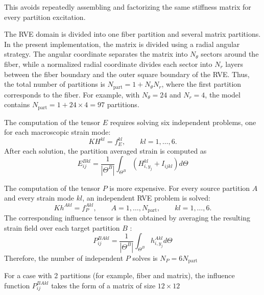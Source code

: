 \documentclass[12pt]{article}
\begin{document}
This avoids repeatedly assembling and factorizing the same stiffness matrix for every partition excitation.

The RVE domain is divided into one fiber partition and several matrix partitions. In the present implementation, the matrix is divided using a radial angular strategy. The angular coordinate separates the matrix into $N_\theta$ sectors around the fiber, while a normalized radial coordinate divides each sector into $N_r$ layers between the fiber boundary and the outer square boundary of the RVE. Thus, the total number of partitions is $N_{\mathrm{part}} = 1 + N_\theta N_r$, where the first partition corresponds to the fiber. For example, with $N_\theta=24$ and $N_r=4$, the model contains $N_{\mathrm{part}} = 1 + 24 \times 4 = 97$ partitions.

The computation of the tensor $E$ requires solving six independent problems, one for each macroscopic strain mode:
\begin{equation}
K H^{kl} = f_E^{kl},
\qquad kl = 1,\ldots,6.
\end{equation}
After each solution, the partition averaged strain is computed as
\begin{equation}
E^{Bkl}_{ij} = \frac{1}{|\Theta^B|}\int_{\Theta^B}\left(H^{kl}_{i,y_j}+I_{ijkl}\right) d\Theta 
\end{equation}

The computation of the tensor $P$ is more expensive. For every source partition $A$ and every strain mode $kl$, an independent RVE problem is solved:
\begin{equation}
K h^{Akl} = f_P^{Akl} ,\qquad A=1,\ldots,N_{\mathrm{part}}, \qquad kl=1,\ldots,6.
\end{equation}
The corresponding influence tensor is then obtained by averaging the resulting strain field over each target partition $B$ \cite{Fish2013}:
\begin{equation}
P^{BAkl}_{ij} = \frac{1}{|\Theta^B|} \int_{\Theta^B} h^{Akl}_{i,y_j}  d\Theta 
\end{equation}
Therefore, the number of independent $P$ solves is $N_P = 6N_{\mathrm{part}}$

For a case with 2 partitions (for example, fiber and matrix), the influence function $P^{BAkl}_{ij}$ takes the form of a matrix of size $12\times12$
\end{document}
